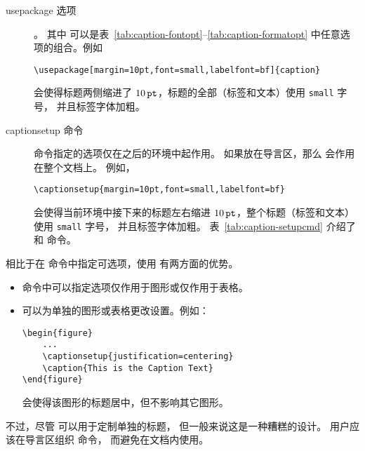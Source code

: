 \begin{description}
	\item[usepackage 选项] 
	
	。
	其中 \opt{[options]} 可以是表~\ref{tab:caption-fontopt}--\ref{tab:caption-formatopt} 中任意选项的组合。例如
\begin{lstlisting}
\usepackage[margin=10pt,font=small,labelfont=bf]{caption}
\end{lstlisting}
	会使得标题两侧缩进了 $10\,\mathtt{pt}$，标题的全部（标签和文本）使用 \texttt{small} 字号，
	并且标签字体加粗。
	
	\item[captionsetup 命令]
	
	 命令指定的选项仅在之后的环境中起作用。
	如果放在导言区，那么  会作用在整个文档上。
	例如，
\begin{lstlisting}
\captionsetup{margin=10pt,font=small,labelfont=bf}
\end{lstlisting}
	会使得当前环境中接下来的标题左右缩进 $10\,\mathtt{pt}$，整个标题（标签和文本）使用 \texttt{small} 字号，
	并且标签字体加粗。
	表~\ref{tab:caption-setupcmd} 介绍了  和  命令。
\end{description}

相比于在  命令中指定可选项，使用  有两方面的优势。
\begin{itemize}
	\item {} 命令中可以指定选项仅作用于图形或仅作用于表格。
	\item {} 可以为单独的图形或表格更改设置。例如：
\begin{lstlisting}
\begin{figure}
	...
	\captionsetup{justification=centering}
	\caption{This is the Caption Text}
\end{figure}
\end{lstlisting}
	会使得该图形的标题居中，但不影响其它图形。
\end{itemize}
不过，尽管  可以用于定制单独的标题，
但一般来说这是一种糟糕的设计。
用户应该在导言区组织  命令，
而避免在文档内使用。

